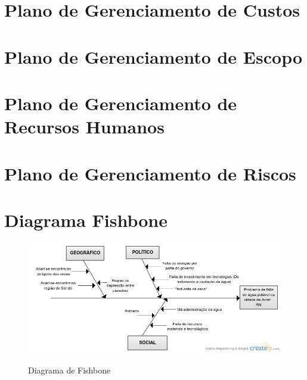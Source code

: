\begin{anexosenv}
  

\chapter{Plano de Gerenciamento de Custos}

  

\chapter{Plano de Gerenciamento de Escopo}

 

\chapter{Plano de Gerenciamento de Recursos Humanos}

  
  
\chapter{Plano de Gerenciamento de Riscos}

  

\chapter{Diagrama Fishbone}
  
  \begin{figure}[!h]
    \centering
    \includegraphics[scale = 0.7, angle = 90]{editaveis/figuras/fishbone}
    \label{fishbone}
    \caption{Diagrama de Fishbone}
   \end{figure}
   \FloatBarrier
  
\end{anexosenv}

